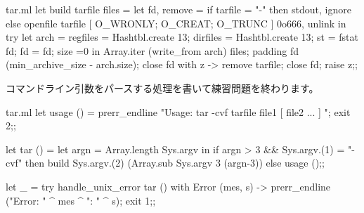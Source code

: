 \begin{answer}
\begin{listingcodefile}{tar.ml}
let build tarfile files =
  let fd, remove =
    if tarfile = "-" then stdout, ignore
    else openfile tarfile [ O_WRONLY; O_CREAT; O_TRUNC ] 0o666, unlink in
  try
    let arch =
         { regfiles = Hashtbl.create 13; dirfiles = Hashtbl.create 13;
           st = fstat fd; fd = fd; size =0 } in
    Array.iter (write_from arch) files;
    padding fd (min_archive_size - arch.size);
    close fd
  with z ->
    remove tarfile; close fd; raise z;;
\end{listingcodefile}
%
コマンドライン引数をパースする処理を書いて練習問題を終わります。
%
\begin{listingcodefile}{tar.ml}
let usage () =
  prerr_endline "Usage: tar -cvf tarfile file1 [ file2 ... ] ";
  exit 2;;

let tar () =
  let argn = Array.length Sys.argv in
  if argn > 3 && Sys.argv.(1) = "-cvf" then
    build Sys.argv.(2) (Array.sub Sys.argv 3 (argn-3))
  else usage ();;

let _ =
  try handle_unix_error tar ()
  with Error (mes, s) ->
    prerr_endline ("Error: " ^ mes ^ ": " ^ s); exit 1;;
\end{listingcodefile}
\end{answer}
